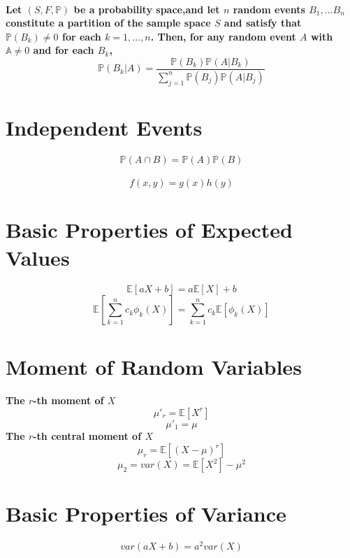 \documentclass[titlepage]{article}
\begin{document}
        \paragraph{
            Let $(S,F,\mathbb{P})$ be a probability space,and let $n$ random events $B_1,...B_n$ constitute a partition of the sample space $S$ and satisfy that $\mathbb{P}(B_k)\neq 0$ for each $k=1,...,n$. Then, for any random event $A$ with $\mathbb{A}\neq 0$ and for each $B_k$,
            $$\mathbb{P}(B_k|A)=\frac{\mathbb{P}(B_k)\mathbb{P}(A|B_k)}{\sum_{j=1}^n\mathbb{P}(B_j)\mathbb{P}(A|B_j)}$$
        }
    \section{Independent Events}
        \paragraph{$$\mathbb{P}(A\cap B)=\mathbb{P}(A)\mathbb{P}(B)$$}
        $$f(x,y)=g(x)h(y)$$
    \section{Basic Properties of Expected Values}
        \paragraph{
            $$\mathbb{E}[aX+b]=a\mathbb{E}[X]+b$$
            $$\mathbb{E}[\sum_{k=1}^n c_k\phi_k(X)]=\sum_{k=1}^nc_k\mathbb{E}[\phi_k(X)]$$
        }
    \section{Moment of Random Variables}
        \paragraph{
            The $r$-th moment of $X$
            $$\mu'_r=\mathbb{E}[X^r]$$
            $$\mu'_1=\mu$$
            The $r$-th central moment of $X$
            $$\mu_r=\mathbb{E}[(X-\mu)^r]$$
            $$\mu_2=var(X)=\mathbb{E}[X^2]-\mu^2$$
        }
    \section{Basic Properties of Variance}
        \paragraph{
            $$var(aX+b)=a^2var(X)$$
        }
\end{document}
